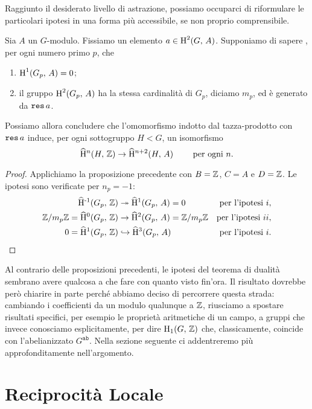 Raggiunto il desiderato livello di astrazione, possiamo occuparci di riformulare le particolari ipotesi in una forma più accessibile, se non proprio comprensibile.

\begin{theorem}
	Sia $ A $ un $ G $-modulo. Fissiamo un elemento $ a \in \operatorname{H}^2(G, \, A) $. Supponiamo di sapere , per ogni numero primo $ p $, che
	\begin{enumerate}[label = \roman*.]
		\item $ \operatorname{H}^1(G_p, \, A) = 0 $;
		\item il gruppo $ \operatorname{H}^2(G_p, \, A) $ ha la stessa cardinalità di $ G_p $, diciamo $ m_p $, ed è generato da $ \operatorname{\mathtt{res}} a $.
	\end{enumerate}
	Possiamo allora concludere che l'omomorfismo indotto dal tazza-prodotto con $ \operatorname{\mathtt{res}} a $ induce, per ogni sottogruppo $ H < G $, un isomorfismo
	\[ \operatorname{\widehat{H}^{\mathnormal{n}}}(H, \, \mathbb{Z}) \to \operatorname{\widehat{H}^{\mathnormal{n}+2}}(H, \,  A) \qquad \text{ per ogni } n.\]
\end{theorem}

\begin{proof}
	Applichiamo la proposizione precedente con $ B = \mathbb{Z} $, $ C = A $ e $ D = \mathbb{Z} $. Le ipotesi sono verificate per $ n_p = -1 $:
	\begin{align*}
		\operatorname{\widehat{H}^{-1}}(G_p,\, \mathbb{Z}) &\twoheadrightarrow \operatorname{\widehat{H}^{1}}(G_p,\, A) = 0 & \text{per l'ipotesi } i, \\
		\mathbb{Z}/m_p\mathbb{Z}=\operatorname{\widehat{H}^{0}}(G_p,\, \mathbb{Z}) &\to \operatorname{\widehat{H}^{2}}(G_p,\, A) = \mathbb{Z}/m_p\mathbb{Z} & \text{per l'ipotesi } ii,\\
		0 = \operatorname{\widehat{H}^{1}}(G_p,\, \mathbb{Z}) &\hookrightarrow \operatorname{\widehat{H}^{3}}(G_p,\, A) & \text{per l'ipotesi } i.
	\end{align*}
\end{proof}
Al contrario delle proposizioni precedenti, le ipotesi del teorema di dualità sembrano avere qualcosa a che fare con quanto visto fin'ora. Il risultato dovrebbe però chiarire in parte perché abbiamo deciso di percorrere questa strada: cambiando i coefficienti da un modulo qualunque a $ \mathbb{Z} $, riusciamo a spostare risultati specifici, per esempio le proprietà aritmetiche di un campo, a gruppi che invece conosciamo esplicitamente, per dire $ \operatorname{H}_1(G, \, \mathbb{Z}) $ che, classicamente, coincide con l'abelianizzato $ G^\texttt{ab} $. Nella sezione seguente ci addentreremo più approfonditamente nell'argomento.
\section{Reciprocità Locale}

